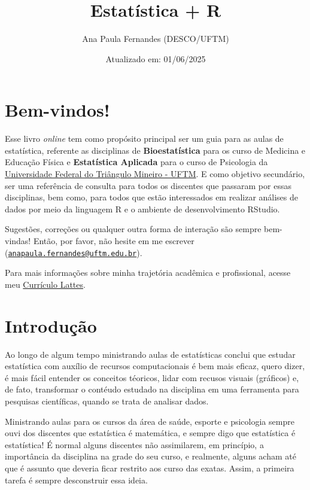 \documentclass[
]{book}
\title{Estatística + R}
\author{Ana Paula Fernandes (DESCO/UFTM)}
\date{Atualizado em: 01/06/2025}
\begin{document}
\maketitle

{
\setcounter{tocdepth}{1}
\tableofcontents
}
\chapter{Bem-vindos!}\label{bem-vindos}

Esse livro \emph{online} tem como propósito principal ser um guia para as aulas de estatística, referente as disciplinas de \textbf{Bioestatística} para os curso de Medicina e Educação Física e \textbf{Estatística Aplicada} para o curso de Psicologia da \href{http://www.uftm.edu.br}{Universidade Federal do Triângulo Mineiro - UFTM}. E como objetivo secundário, ser uma referência de consulta para todos os discentes que passaram por essas disciplinas, bem como, para todos que estão interessados em realizar análises de dados por meio da linguagem R e o ambiente de desenvolvimento RStudio.

Sugestões, correções ou qualquer outra forma de interação são sempre bem-vindas! Então, por favor, não hesite em me escrever (\href{mailto:anapaula.fernandes@uftm.edu.br}{\nolinkurl{anapaula.fernandes@uftm.edu.br}}).

Para mais informações sobre minha trajetória acadêmica e profissional, acesse meu \href{https://lattes.cnpq.br/5582801060910261}{Currículo Lattes}.

\chapter{Introdução}\label{intro}

Ao longo de algum tempo ministrando aulas de estatísticas conclui que estudar estatística com auxílio de recursos computacionais é bem mais eficaz, quero dizer, é mais fácil entender os conceitos téoricos, lidar com recusos visuais (gráficos) e, de fato, transformar o contéudo estudado na disciplina em uma ferramenta para pesquisas científicas, quando se trata de analisar dados.

Ministrando aulas para os cursos da área de saúde, esporte e psicologia sempre ouvi dos discentes que estatística é matemática, e sempre digo que estatística é estatística! É normal alguns discentes não assimilarem, em princípio, a importância da disciplina na grade do seu curso, e realmente, alguns acham até que é assunto que deveria ficar restrito aos curso das exatas. Assim, a primeira tarefa é sempre desconstruir essa ideia.
\end{document}
